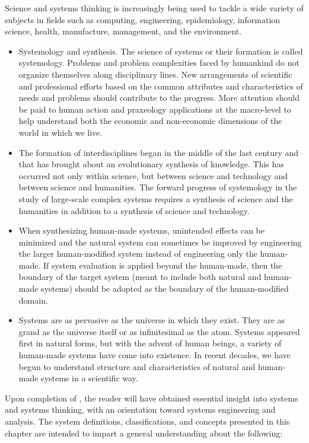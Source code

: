 Science and systems thinking is increasingly being used to tackle a wide variety of subjects in fields such as computing, engineering, epidemiology, information science, health, manufacture, management, and the environment.

\begin{itemize}
\item Systemology and synthesis. The science of systems or their formation is called systemology. Problems and problem complexities faced by humankind do not organize themselves along disciplinary lines. New arrangements of scientific and professional efforts based on the common attributes and characteristics of needs and problems should contribute to the progress. More attention should be paid to human action and praxeology applications at the macro-level to help understand both the economic and non-economic dimensions of the world in which we live.
\item The formation of interdisciplines began in the middle of the last century and that has brought about an evolutionary synthesis of knowledge. This has occurred not only within science, but between science and technology and between science and humanities. The forward progress of systemology in the study of large-scale complex systems requires a synthesis of science and the humanities in addition to a synthesis of science and technology.
\item When synthesizing human-made systems, unintended effects can be minimized and the natural system can sometimes be improved by engineering the larger human-modified system instead of engineering only the human-made. If system evaluation is applied beyond the human-made, then the boundary of the target system (meant to include both natural and human-made systems) should be adopted as the boundary of the human-modified domain.
\item Systems are as pervasive as the universe in which they exist. They are as grand as the universe itself or as infinitesimal as the atom. Systems appeared first in natural forms, but with the advent of human beings, a variety of human-made systems have come into existence. In recent decades, we have begun to understand structure and characteristics of natural and human-made systems in a scientific way.
\end{itemize}

Upon completion of , the reader will have obtained essential insight into systems and systems thinking, with an orientation toward systems engineering and analysis. The system definitions, classifications, and concepts presented in this chapter are intended to impart a general understanding about the following:

